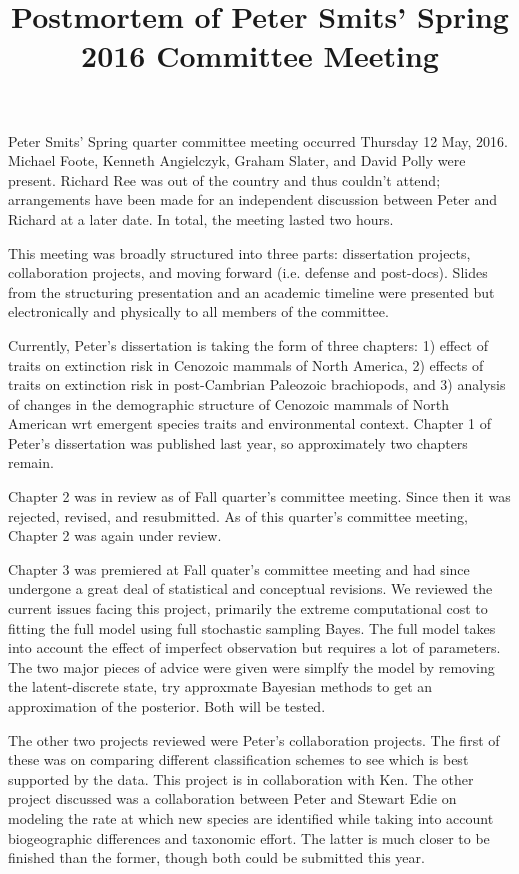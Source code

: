 \documentclass{article}
\title{Postmortem of Peter Smits' Spring 2016 Committee Meeting}
\date{}
\begin{document}
\linenumbers
\modulolinenumbers[2]

\maketitle

Peter Smits' Spring quarter committee meeting occurred Thursday 12 May, 2016. Michael Foote, Kenneth Angielczyk, Graham Slater, and David Polly were present. Richard Ree was out of the country and thus couldn't attend; arrangements have been made for an independent discussion between Peter and Richard at a later date. In total, the meeting lasted two hours.

This meeting was broadly structured into three parts: dissertation projects, collaboration projects, and moving forward (i.e. defense and post-docs). Slides from the structuring presentation and an academic timeline were presented but electronically and physically to all members of the committee.

Currently, Peter's dissertation is taking the form of three chapters: 1) effect of traits on extinction risk in Cenozoic mammals of North America, 2) effects of traits on extinction risk in post-Cambrian Paleozoic brachiopods, and 3) analysis of changes in the demographic structure of Cenozoic mammals of North American wrt emergent species traits and environmental context. Chapter 1 of Peter's dissertation was published last year, so approximately two chapters remain. 

Chapter 2 was in review as of Fall quarter's committee meeting. Since then it was rejected, revised, and resubmitted. As of this quarter's committee meeting, Chapter 2 was again under review.

Chapter 3 was premiered at Fall quater's committee meeting and had since undergone a great deal of statistical and conceptual revisions. We reviewed the current issues facing this project, primarily the extreme computational cost to fitting the full model using full stochastic sampling Bayes. The full model takes into account the effect of imperfect observation but requires a lot of parameters. The two major pieces of advice were given were simplfy the model by removing the latent-discrete state, try approxmate Bayesian methods to get an approximation of the posterior. Both will be tested.

The other two projects reviewed were Peter's collaboration projects. The first of these was on comparing different classification schemes to see which is best supported by the data. This project is in collaboration with Ken. The other project discussed was a collaboration between Peter and Stewart Edie on modeling the rate at which new species are identified while taking into account biogeographic differences and taxonomic effort. The latter is much closer to be finished than the former, though both could be submitted this year.
\end{document}
